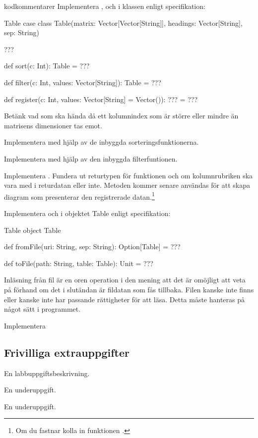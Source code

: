 \TODO kodkommentarer
\Task Implementera ,  och  i klassen  enligt specifikation:

\begin{ScalaSpec}{Table}
case class Table(matrix: Vector[Vector[String]], headings: Vector[String], sep: String) {

  ???

  def sort(c: Int): Table = ???

  def filter(c: Int, values: Vector[String]): Table = ???

  def register(c: Int, values: Vector[String] = Vector()): ??? = ???
}
\end{ScalaSpec}

Betänk vad som ska hända då ett kolumnindex som är större eller mindre än matrisens dimensioner tas emot. \TODO

\Subtask Implementera  med hjälp av de inbyggda sorteringsfunktionerna.

\Subtask Implementera  med hjälp av den inbyggda filterfuntionen.

\Subtask Implementera . Fundera ut returtypen för funktionen och om kolumnrubriken ska vara med i returdatan eller inte. Metoden kommer senare användas för att skapa diagram som presenterar den registrerade datan.\footnote{Om du fastnar kolla in funktionen .}

\Task Implementera  och  i objektet Table enligt specifikation:
\begin{ScalaSpec}{Table}
object Table {

  def fromFile(uri: String, sep: String): Option[Table] = ???

  def toFile(path: String, table: Table): Unit = ???
}
\end{ScalaSpec}

Inläsning från fil är en oren operation i den mening att det är omöjligt att veta på förhand om det i slutändan är fildatan som fås tillbaka. Filen kanske inte finns eller kanske inte har passande rättigheter för att läsa.
Detta måste hanteras på något sätt i programmet.

\Subtask Implementera 
\subsection{Frivilliga extrauppgifter}
    
\Task En labbuppgiftsbeskrivning.

\Subtask En underuppgift.

\Subtask En underuppgift.